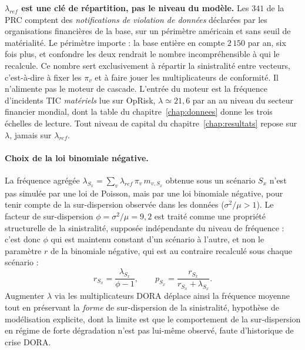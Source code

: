 \begin{attention}
\textbf{$\lambda_{ref}$ est une clé de répartition, pas le niveau du modèle.} Les $341$ de la
PRC comptent des \emph{notifications de violation de données} déclarées par les organisations
financières de la base, sur un périmètre américain et sans seuil de matérialité. Le périmètre
importe : la base entière en compte $2\,150$ par an, six fois plus, et confondre les deux
rendrait le nombre incompréhensible à qui le recalcule. Ce nombre sert exclusivement à
répartir la sinistralité entre
vecteurs, c'est-à-dire à fixer les $\pi_v$ et à faire jouer les multiplicateurs de conformité.
Il n'alimente pas le moteur de cascade. L'entrée du moteur est la fréquence
d'incidents TIC \emph{matériels} lue sur OpRisk, $\lambda \simeq 21{,}6$ par an au
niveau du secteur financier mondial, dont la table du chapitre~\ref{chap:donnees} donne les
trois échelles de lecture. Tout niveau de capital du chapitre~\ref{chap:resultats} repose sur
$\lambda$, jamais sur $\lambda_{ref}$.
\end{attention}

\paragraph{Choix de la loi binomiale négative.} La fréquence agrégée
$\lambda_{S_x} = \sum_v \lambda_{ref}\,\pi_v\, m_{v,S_x}$ obtenue sous un
scénario $S_x$ n'est pas simulée par une loi de Poisson, mais par une loi
binomiale négative, pour tenir compte de la sur-dispersion observée dans les
données ($\sigma^2/\mu > 1$). Le facteur de sur-dispersion
$\phi = \sigma^2/\mu = 9{,}2$ est traité comme une propriété structurelle de
la sinistralité, supposée indépendante du niveau de fréquence : c'est donc
$\phi$ qui est maintenu constant d'un scénario à l'autre, et non le
paramètre $r$ de la binomiale négative, qui est au contraire recalculé sous
chaque scénario :
\begin{equation}
r_{S_x} = \frac{\lambda_{S_x}}{\phi - 1},
\qquad
p_{S_x} = \frac{r_{S_x}}{r_{S_x} + \lambda_{S_x}}.
\end{equation}
Augmenter $\lambda$ via les multiplicateurs DORA déplace ainsi la fréquence
moyenne tout en préservant la \emph{forme} de sur-dispersion de la
sinistralité, hypothèse de modélisation explicite, dont la limite est
que le comportement de la sur-dispersion en régime de forte dégradation
n'est pas lui-même observé, faute d'historique de crise DORA.

